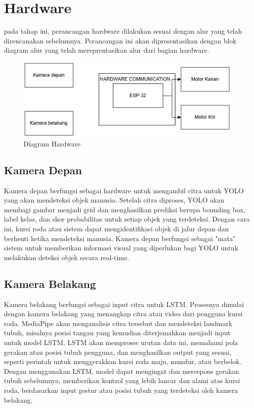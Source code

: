 \section{Hardware}
pada tahap ini, perancangan hardware dilakukan sesuai dengan alur yang telah direncanakan sebelumnya. Perancangan ini akan dipresentasikan dengan blok diagram alur yang telah mereprentasikan alur dari bagian hardware.
\begin{figure} [H] \centering
  \includegraphics[scale=0.6]{gambar/hardware new.jpg}
  \caption{Diagram Hardware}
  \label{fig:hardware}
\end{figure}

\subsection{Kamera Depan}
Kamera depan berfungsi sebagai hardware untuk mengambil citra untuk YOLO yang akan mendeteksi objek manusia. Setelah citra diproses, YOLO akan membagi gambar menjadi grid dan menghasilkan prediksi berupa bounding box, label kelas, dan skor probabilitas untuk setiap objek yang terdeteksi. Dengan cara ini, kursi roda atau sistem dapat mengidentifikasi objek di jalur depan dan berhenti ketika mendeteksi manusia. Kamera depan berfungsi sebagai "mata" sistem untuk memberikan informasi visual yang diperlukan bagi YOLO untuk melakukan deteksi objek secara real-time.

\subsection{Kamera Belakang}
Kamera belakang berfungsi sebagai input citra untuk LSTM. Prosesnya dimulai dengan kamera belakang yang menangkap citra atau video dari pengguna kursi roda. MediaPipe akan menganalisis citra tersebut dan mendeteksi landmark tubuh, misalnya posisi tangan yang kemudian diterjemahkan menjadi input untuk model LSTM. LSTM akan memproses urutan data ini, memahami pola gerakan atau posisi tubuh pengguna, dan menghasilkan output yang sesuai, seperti perintah untuk menggerakkan kursi roda maju, mundur, atau berbelok. Dengan menggunakan LSTM, model dapat mengingat dan merespons gerakan tubuh sebelumnya, memberikan kontrol yang lebih lancar dan alami atas kursi roda, berdasarkan input gestur atau posisi tubuh yang terdeteksi oleh kamera belakang.
